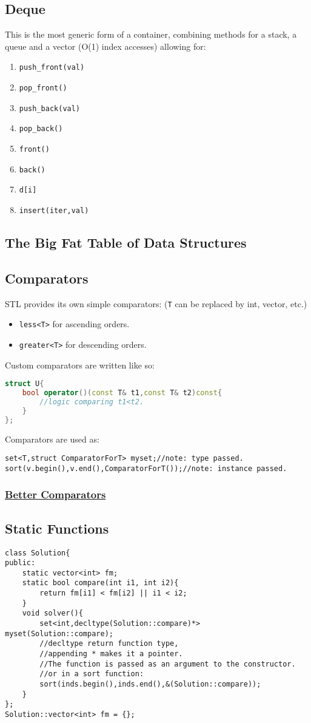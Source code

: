 \documentclass{article}
\begin{document}
\subsection{Deque}
This is the most generic form of a container, combining methods for a stack, a queue and a vector (O(1) index accesses) allowing for:
\begin{enumerate}
\item \texttt{push\_front(val)}
\item \texttt{pop\_front()}
\item \texttt{push\_back(val)}
\item \texttt{pop\_back()}
\item \texttt{front()}
\item \texttt{back()}
\item \texttt{d[i]}
\item \texttt{insert(iter,val)}
\end{enumerate}
\subsection{The Big Fat Table of Data Structures}

\subsection{Comparators}
STL provides its own simple comparators: (\texttt{T} can be replaced by
int, vector, etc.)
\begin{itemize}
    \item \texttt{less<T>} for ascending orders.
    \item \texttt{greater<T>} for descending orders.
\end{itemize} Custom comparators are written like so:
\begin{lstlisting}[caption={Comparators},language=C++]
struct U{
    bool operator()(const T& t1,const T& t2)const{
        //logic comparing t1<t2.
    }
};
\end{lstlisting}
Comparators are used as:
\begin{lstlisting}
set<T,struct ComparatorForT> myset;//note: type passed.
sort(v.begin(),v.end(),ComparatorForT());//note: instance passed.
\end{lstlisting}
\subsubsection{\href{https://stackoverflow.com/a/46128321/14681493}{Better Comparators}}
\subsection*{Static Functions}
\begin{lstlisting}
class Solution{
public:
    static vector<int> fm;
    static bool compare(int i1, int i2){
        return fm[i1] < fm[i2] || i1 < i2;
    }
    void solver(){
        set<int,decltype(Solution::compare)*> myset(Solution::compare);
        //decltype return function type,
        //appending * makes it a pointer.
        //The function is passed as an argument to the constructor.
        //or in a sort function:
        sort(inds.begin(),inds.end(),&(Solution::compare));
    }
};
Solution::vector<int> fm = {};
\end{lstlisting}
\end{document}
